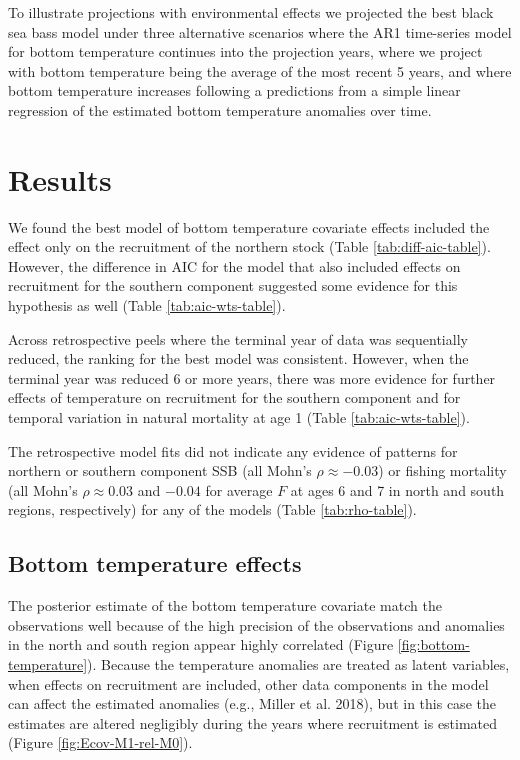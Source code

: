 \documentclass[
]{article}
\begin{document}
To illustrate projections with environmental effects we projected the
best black sea bass model under three alternative scenarios where the
AR1 time-series model for bottom temperature continues into the
projection years, where we project with bottom temperature being the
average of the most recent 5 years, and where bottom temperature
increases following a predictions from a simple linear regression of the
estimated bottom temperature anomalies over time.

\hypertarget{results}{%
\section*{Results}\label{results}}

We found the best model of bottom temperature covariate effects included
the effect only on the recruitment of the northern stock (Table
\ref{tab:diff-aic-table}). However, the difference in AIC for the model
that also included effects on recruitment for the southern component
suggested some evidence for this hypothesis as well (Table
\ref{tab:aic-wts-table}).

Across retrospective peels where the terminal year of data was
sequentially reduced, the ranking for the best model was consistent.
However, when the terminal year was reduced 6 or more years, there was
more evidence for further effects of temperature on recruitment for the
southern component and for temporal variation in natural mortality at
age 1 (Table \ref{tab:aic-wts-table}).

The retrospective model fits did not indicate any evidence of patterns
for northern or southern component SSB (all Mohn's
\(\rho \approx -0.03\)) or fishing mortality (all Mohn's
\(\rho \approx 0.03\) and \(-0.04\) for average \(F\) at ages 6 and 7 in
north and south regions, respectively) for any of the models (Table
\ref{tab:rho-table}).

\hypertarget{bottom-temperature-effects-1}{%
\subsection*{Bottom temperature
effects}\label{bottom-temperature-effects-1}}

The posterior estimate of the bottom temperature covariate match the
observations well because of the high precision of the observations and
anomalies in the north and south region appear highly correlated (Figure
\ref{fig:bottom-temperature}). Because the temperature anomalies are
treated as latent variables, when effects on recruitment are included,
other data components in the model can affect the estimated anomalies
(e.g., Miller et al. 2018), but in this case the estimates are altered
negligibly during the years where recruitment is estimated (Figure
\ref{fig:Ecov-M1-rel-M0}).
\end{document}
